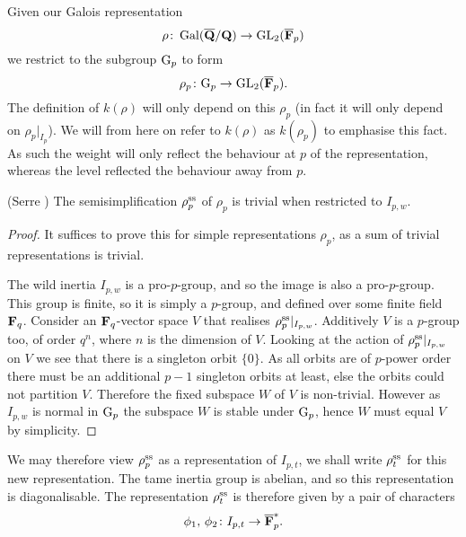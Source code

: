 \documentclass[a4paper,12pt]{article}
\begin{document}
Given our Galois representation
\[
\rho \colon \operatorname{Gal}(\overline{\mathbf{Q}}/\mathbf{Q}) \to \operatorname{GL}_2(\overline{\mathbf{F}}_p)
\]
we restrict to the subgroup $\mathrm{G}_p$ to form
\[
\rho_p\colon \mathrm{G}_p \to \operatorname{GL}_2(\overline{\mathbf{F}}_p).
\]
The definition of $k(\rho)$ will only depend on this $\rho_p$ (in fact it will only depend on $\rho_p|_{I_p}$).
We will from here on refer to $k(\rho)$ as $k(\rho_p)$ to emphasise this fact.
As such the weight will only reflect the behaviour at $p$ of the representation, whereas the level reflected the behaviour away from $p$.

\begin{prop}(Serre \cite[prop. 4]{Serre72})\label{prop:wildtriv}
The semisimplification $\rho^\text{ss}_p$ of $\rho_p$ is trivial when restricted to $I_{p,w}$.
\end{prop}
\begin{proof}
It suffices to prove this for simple representations $\rho_p$, as a sum of trivial representations is trivial.

The wild inertia $I_{p,w}$ is a pro-$p$-group, and so the image is also a pro-$p$-group.
This group is finite, so it is simply a $p$-group, and defined over some finite field $\mathbf{F}_q$.
Consider an $\mathbf{F}_q$-vector space $V$ that realises $\rho^\text{ss}_p|_{I_{p,w}}$.
Additively $V$ is a $p$-group too, of order $q^n$, where $n$ is the dimension of $V$.
Looking at the action of $\rho^\text{ss}_p|_{I_{p,w}}$ on $V$ we see that there is a singleton orbit $\{0\}$.
As all orbits are of $p$-power order there must be an additional $p-1$ singleton orbits at least, else the orbits could not partition $V$.
Therefore the fixed subspace $W$ of $V$ is non-trivial.
However as $I_{p,w}$ is normal in $\mathrm{G}_p$ the subspace $W$ is stable under $\mathrm{G}_p$, hence $W$ must equal $V$ by simplicity.
\end{proof}

We may therefore view $\rho^\text{ss}_p$ as a representation of $I_{p,t}$, we shall write $\rho^\text{ss}_t$ for this new representation.
The tame inertia group is abelian, and so this representation is diagonalisable.
The representation $\rho^\text{ss}_t$ is therefore given by a pair of characters
\[
\phi_1,\,\phi_2\colon I_{p,t} \to \overline{\mathbf{F}}_p^*.
\]
\end{document}
